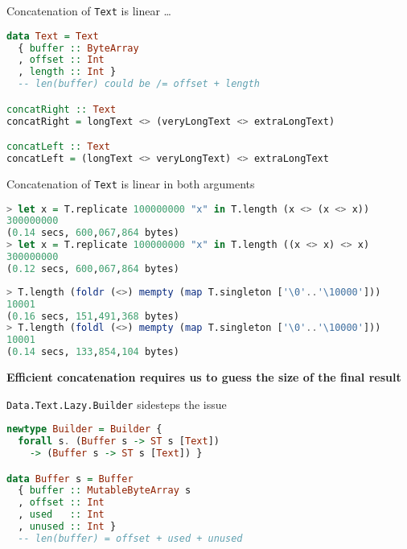 \documentclass[handout]{beamer}
\begin{document}
\begin{frame}[fragile]{Concatenation of {\tt Text} is linear \dots}

\begin{lstlisting}[language=Haskell,xleftmargin=-1.0ex]
data Text = Text
  { buffer :: ByteArray
  , offset :: Int
  , length :: Int }
  -- len(buffer) could be /= offset + length

concatRight :: Text
concatRight = longText <> (veryLongText <> extraLongText)

concatLeft :: Text
concatLeft = (longText <> veryLongText) <> extraLongText
\end{lstlisting}
\end{frame}

\begin{frame}[fragile]{Concatenation of {\tt Text} is linear in both arguments}
\small
\begin{lstlisting}[language=Haskell,xleftmargin=-3.0ex]
> let x = T.replicate 100000000 "x" in T.length (x <> (x <> x))
300000000
(0.14 secs, 600,067,864 bytes)
> let x = T.replicate 100000000 "x" in T.length ((x <> x) <> x)
300000000
(0.12 secs, 600,067,864 bytes)
\end{lstlisting}

\pause

\begin{lstlisting}[language=Haskell,xleftmargin=-3.0ex]
> T.length (foldr (<>) mempty (map T.singleton ['\0'..'\10000']))
10001
(0.16 secs, 151,491,368 bytes)
> T.length (foldl (<>) mempty (map T.singleton ['\0'..'\10000']))
10001
(0.14 secs, 133,854,104 bytes)
\end{lstlisting}

\pause\bigskip

\centerline{\bf
Efficient concatenation requires us to guess the size of the final result
}
\end{frame}

\begin{frame}[fragile]{{\tt Data.Text.Lazy.Builder} sidesteps the issue}

\begin{lstlisting}[language=Haskell]
newtype Builder = Builder {
  forall s. (Buffer s -> ST s [Text])
    -> (Buffer s -> ST s [Text]) }

data Buffer s = Buffer
  { buffer :: MutableByteArray s
  , offset :: Int
  , used   :: Int
  , unused :: Int }
  -- len(buffer) = offset + used + unused
\end{lstlisting}

\end{frame}
\end{document}
